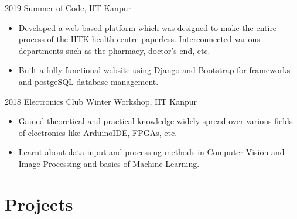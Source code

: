 \documentclass[]{style}          %
\begin{document}
\begin{entrylist}
\entry
  {2019}
  {Summer of Code, IIT Kanpur}
  {}
  {
  \begin{itemize}
      \item Developed a web based platform which was designed to make the entire process of the IITK health centre paperless. Interconnected various departments such as the pharmacy, doctor's end, etc.
      \item Built a fully functional website using Django and Bootstrap for frameworks and postgeSQL database management.
  \end{itemize}}
\entry
  {2018}
  {Electronics Club Winter Workshop, IIT Kanpur}{}
  {\begin{itemize}
      \item Gained theoretical and practical knowledge widely spread over various fields of electronics like ArduinoIDE, FPGAs, etc.
      \item Learnt about data input and processing methods in Computer Vision and Image Processing and basics of Machine Learning.
  \end{itemize}}
{\vspace{-0.6cm}}
\end{entrylist}



\section{Projects}
\end{document}
